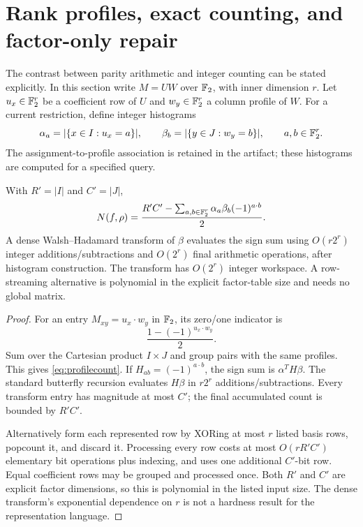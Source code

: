 \section{Rank profiles, exact counting, and factor-only repair}
\label{sec:profiles}
The contrast between parity arithmetic and integer counting can be stated explicitly. In this section write $M=UW$ over $\mathbb F_2$, with inner dimension $r$. Let $u_x\in\mathbb F_2^r$ be a coefficient row of $U$ and $w_y\in\mathbb F_2^r$ a column profile of $W$. For a current restriction, define integer histograms
\begin{equation}
 \alpha_a=|\{x\in I:u_x=a\}|,\qquad
 \beta_b=|\{y\in J:w_y=b\}|,\qquad a,b\in\mathbb F_2^r.
 \label{eq:profiles}
\end{equation}
The assignment-to-profile association is retained in the artifact; these histograms are computed for a specified query.

\begin{theorem}
\label{thm:profile}
With $R'=|I|$ and $C'=|J|$,
\begin{equation}
 N(f,\rho)=\frac{R'C'-\sum_{a,b\in\mathbb F_2^r}\alpha_a\beta_b(-1)^{a\cdot b}}{2}.
 \label{eq:profilecount}
\end{equation}
A dense Walsh--Hadamard transform of $\beta$ evaluates the sign sum using $O(r2^r)$ integer additions/subtractions and $O(2^r)$ final arithmetic operations, after histogram construction. The transform has $O(2^r)$ integer workspace. A row-streaming alternative is polynomial in the explicit factor-table size and needs no global matrix.
\end{theorem}
\begin{proof}
For an entry $M_{xy}=u_x\cdot w_y$ in $\mathbb F_2$, its zero/one indicator is
\[
 \frac{1-(-1)^{u_x\cdot w_y}}2.
\]
Sum over the Cartesian product $I\times J$ and group pairs with the same profiles. This gives \eqref{eq:profilecount}. If $H_{ab}=(-1)^{a\cdot b}$, the sign sum is $\alpha^T H\beta$. The standard butterfly recursion evaluates $H\beta$ in $r2^r$ additions/subtractions. Every transform entry has magnitude at most $C'$; the final accumulated count is bounded by $R'C'$.

Alternatively form each represented row by XORing at most $r$ listed basis rows, popcount it, and discard it. Processing every row costs at most $O(rR'C')$ elementary bit operations plus indexing, and uses one additional $C'$-bit row. Equal coefficient rows may be grouped and processed once. Both $R'$ and $C'$ are explicit factor dimensions, so this is polynomial in the listed input size. The dense transform's exponential dependence on $r$ is not a hardness result for the representation language.
\end{proof}

